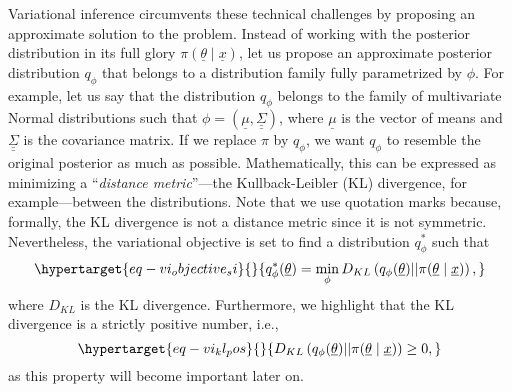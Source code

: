 \documentclass[
]{scrartcl}
\begin{document}
\begin{refsegment}
Variational inference circumvents these technical challenges by
proposing an approximate solution to the problem. Instead of working
with the posterior distribution in its full glory
\(\pi(\underline{\theta} \mid \underline{x})\), let us propose an
approximate posterior distribution \(q_\phi\) that belongs to a
distribution family fully parametrized by \(\phi\). For example, let us
say that the distribution \(q_\phi\) belongs to the family of
multivariate Normal distributions such that
\(\phi = (\underline{\mu}, \underline{\underline{\Sigma}})\), where
\(\underline{\mu}\) is the vector of means and
\(\underline{\underline{\Sigma}}\) is the covariance matrix. If we
replace \(\pi\) by \(q_\phi\), we want \(q_\phi\) to resemble the
original posterior as much as possible. Mathematically, this can be
expressed as minimizing a ``\emph{distance metric}''---the
Kullback-Leibler (KL) divergence, for example---between the
distributions. Note that we use quotation marks because, formally, the
KL divergence is not a distance metric since it is not symmetric.
Nevertheless, the variational objective is set to find a distribution
\(q_\phi^*\) such that
\begin{equation}\protect\hypertarget{eq-vi_objective_si}{}{
q_\phi^*(\underline{\theta}) =
\min_\phi D_{KL}\left(
    q_\phi(\underline{\theta}) \vert\vert 
    \pi(\underline{\theta} \mid \underline{x})
\right),
}\label{eq-vi_objective_si}\end{equation} where \(D_{KL}\) is the KL
divergence. Furthermore, we highlight that the KL divergence is a
strictly positive number, i.e.,
\begin{equation}\protect\hypertarget{eq-vi_kl_pos}{}{
D_{KL}\left(
    q_\phi(\underline{\theta}) \vert\vert 
    \pi(\underline{\theta} \mid \underline{x})
\right) \geq 0,
}\label{eq-vi_kl_pos}\end{equation} as this property will become
important later on.


\end{refsegment}
\end{document}

